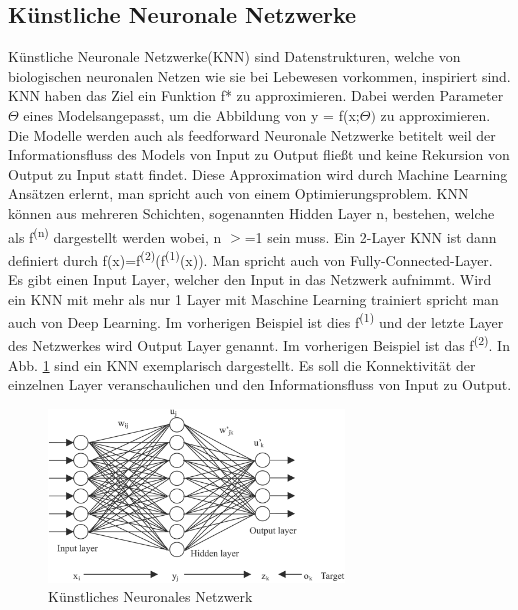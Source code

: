 \documentclass{llncs}
\begin{document}
\subsection{Künstliche Neuronale Netzwerke}

Künstliche Neuronale Netzwerke(KNN) sind Datenstrukturen, welche von biologischen neuronalen Netzen wie sie bei Lebewesen vorkommen, inspiriert sind. KNN haben das Ziel ein Funktion f* zu approximieren. Dabei werden Parameter $\Theta$ eines Modelsangepasst, um die Abbildung von y = f(x;$\Theta)$ zu approximieren. Die Modelle werden auch als feedforward Neuronale Netzwerke betitelt weil der Informationsfluss des Models von Input zu Output fließt und keine Rekursion von Output zu Input statt findet. Diese Approximation wird durch Machine Learning Ansätzen erlernt, man spricht auch von einem Optimierungsproblem. KNN können aus mehreren Schichten, sogenannten Hidden Layer n, bestehen, welche als f\textsuperscript{(n)} dargestellt werden wobei, n $>$=1 sein muss. Ein 2-Layer KNN ist dann definiert durch f(x)=f\textsuperscript{(2)}(f\textsuperscript{(1)}(x)). Man spricht auch von Fully-Connected-Layer. Es gibt einen Input Layer, welcher den Input in das Netzwerk aufnimmt\cite{Grundlagen}. Wird ein KNN mit mehr als nur 1 Layer mit Maschine Learning trainiert spricht man auch von Deep Learning. Im vorherigen Beispiel ist dies f\textsuperscript{(1)} und der letzte Layer des Netzwerkes wird Output Layer genannt. Im vorherigen Beispiel ist das f\textsuperscript{(2)}. In Abb. \ref{fig:Bild1} sind ein KNN exemplarisch dargestellt. Es soll die Konnektivität der einzelnen Layer veranschaulichen und den Informationsfluss von Input zu Output.
\newpage
\begin{figure}[htbp]
	\centering
	\includegraphics[width=0.7\textwidth]{neuronalesnetzwerk.png}
	\caption{Künstliches Neuronales Netzwerk\protect\cite{annpic}}
	\label{fig:Bild1}
\end{figure}
~\\\\
\end{document}
